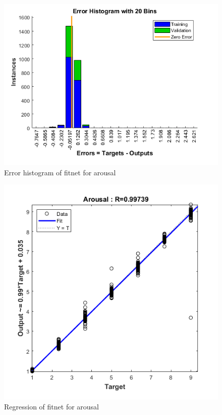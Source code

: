 \documentclass[a4paper]{report}
\begin{document}
	\begin{figure}[htbp]
		\centering
		\includegraphics[scale=0.9]{img/errorhist_fitnet_arousal.png}
		\caption{Error histogram of fitnet for arousal}
		\label{img: errorhist_fitnet_arousal}
	\end{figure}
	
	\begin{figure}[htbp]
		\centering
		\includegraphics[scale=0.9]{img/regression_fitnet_arousal.png}
		\caption{Regression of fitnet for arousal}
		\label{img: regression_fitnet_arousal}
	\end{figure}
\end{document}
